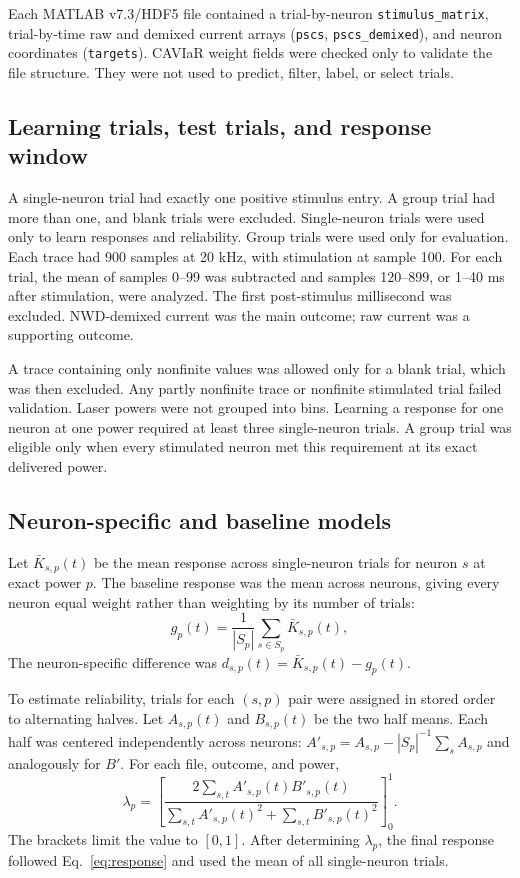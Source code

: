 \documentclass[10pt,twocolumn]{article}
\begin{document}
Each MATLAB v7.3/HDF5 file contained a trial-by-neuron
\texttt{stimulus\_matrix}, trial-by-time raw and demixed current arrays
(\texttt{pscs}, \texttt{pscs\_demixed}), and neuron coordinates
(\texttt{targets}). CAVIaR weight fields were checked only to validate the
file structure. They were not used to
predict, filter, label, or select trials.

\subsection{Learning trials, test trials, and response window}

A single-neuron trial had exactly one positive stimulus entry. A group trial
had more than one, and blank trials were excluded. Single-neuron trials were
used only to learn responses and reliability. Group trials were used only
for evaluation. Each trace had 900 samples at 20 kHz, with stimulation at
sample 100. For each trial, the mean of samples 0--99 was subtracted and
samples 120--899, or 1--40 ms after stimulation, were analyzed. The first
post-stimulus millisecond was excluded. NWD-demixed current was the main
outcome; raw current was a supporting outcome.

A trace containing only nonfinite values was allowed only for a blank trial,
which was then excluded. Any partly nonfinite trace or nonfinite stimulated
trial failed validation. Laser powers were not grouped into bins. Learning a
response for one neuron at one power required at least three single-neuron
trials. A group trial was eligible only when every stimulated neuron met this
requirement at its exact delivered power.

\subsection{Neuron-specific and baseline models}

Let $\bar{K}_{s,p}(t)$ be the mean response across single-neuron trials for
neuron $s$ at exact power $p$. The baseline response was the mean across
neurons, giving every neuron equal weight rather than weighting by its number
of trials:
\begin{equation}
g_p(t)=\frac{1}{|S_p|}\sum_{s\in S_p}\bar{K}_{s,p}(t),
\end{equation}
The neuron-specific difference was
$d_{s,p}(t)=\bar{K}_{s,p}(t)-g_p(t)$.

To estimate reliability, trials for each $(s,p)$ pair were assigned in stored
order to alternating halves. Let $A_{s,p}(t)$ and $B_{s,p}(t)$ be the two
half means. Each half was centered independently across neurons:
$A'_{s,p}=A_{s,p}-|S_p|^{-1}\sum_s A_{s,p}$ and analogously for $B'$.
For each file, outcome, and power,
\begin{equation}
\lambda_p =
\left[
\frac{2\sum_{s,t} A'_{s,p}(t)B'_{s,p}(t)}
{\sum_{s,t}A'_{s,p}(t)^2+\sum_{s,t}B'_{s,p}(t)^2}
\right]_{0}^{1}.
\end{equation}
The brackets limit the value to $[0,1]$. After determining $\lambda_p$, the
final response followed Eq.~\ref{eq:response} and used the mean of all
single-neuron trials.
\end{document}
